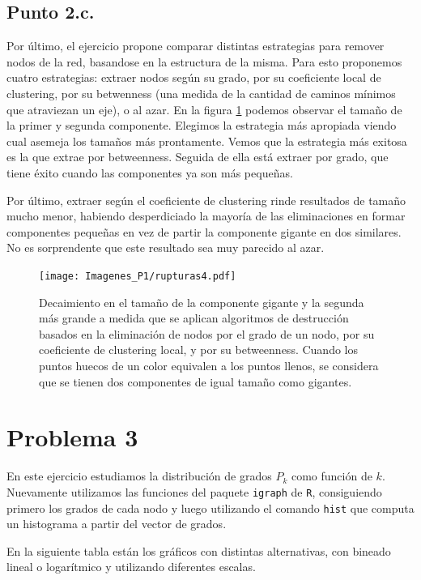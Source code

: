 \documentclass{article}
\begin{document}
\subsection{Punto 2.c.}
Por último, el ejercicio propone comparar distintas estrategias para remover nodos de la red, basandose en la estructura de la misma. Para esto proponemos cuatro estrategias: extraer nodos según su grado, por su coeficiente local de clustering, por su betwenness (una medida de la cantidad de caminos mínimos que atraviezan un eje), o al azar. En la figura \ref{rupturas} podemos observar el tamaño de la primer y segunda componente. Elegimos la estrategia más apropiada viendo cual asemeja los tamaños más prontamente. Vemos que la estrategia más exitosa es la que extrae por betweenness. Seguida de ella está extraer por grado, que tiene éxito cuando las componentes ya son más pequeñas.

Por último, extraer según el coeficiente de clustering rinde resultados de tamaño mucho menor, habiendo desperdiciado la mayoría de las eliminaciones en formar componentes pequeñas en vez de partir la componente gigante en dos similares. No es sorprendente que este resultado sea muy parecido al azar.

\begin{figure}[!htb]
   \centering
   \begin{minipage}{0.6\textwidth}
    \centering
    \texttt{[image: Imagenes\_P1/rupturas4.pdf]}
    \caption{Decaimiento en el tamaño de la componente gigante y la segunda más grande a medida que se aplican algoritmos de destrucción basados en la eliminación de nodos por el grado de un nodo, por su coeficiente de clustering local, y por su betweenness. Cuando los puntos huecos de un color equivalen a los puntos llenos, se considera que se tienen dos componentes de igual tamaño como gigantes.}
    \label{rupturas}
   \end{minipage}
\end{figure}

\section{Problema 3}
En este ejercicio estudiamos la distribución de grados $P_k$ como función de $k$. Nuevamente utilizamos las funciones del paquete \texttt{igraph} de \texttt{R}, consiguiendo primero los grados de cada nodo y luego utilizando el comando \texttt{hist} 	que computa un histograma a partir del vector de grados.

En la siguiente tabla están los gráficos con distintas alternativas, con bineado lineal o logarítmico y utilizando diferentes escalas.
\end{document}
